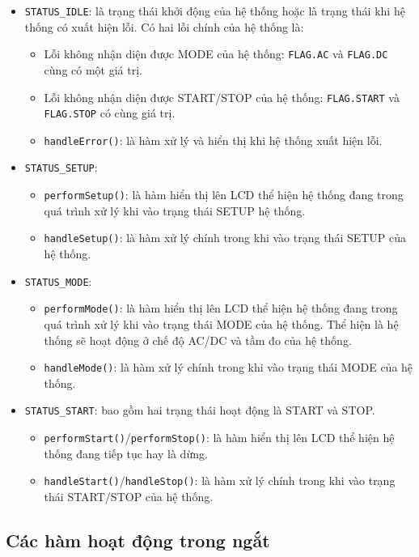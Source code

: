 \begin{itemize}[label = -]
	\item \texttt{STATUS\_IDLE}: là trạng thái khởi động của hệ thống hoặc là trạng thái khi hệ thống có xuất hiện lỗi. Có hai lỗi chính của hệ thống là:
		\begin{itemize}[label=+]
			\item Lỗi không nhận diện được MODE của hệ thống: \texttt{FLAG.AC} và \texttt{FLAG.DC} cùng có một giá trị.
			\item Lỗi không nhận diện được START/STOP của hệ thống: \texttt{FLAG.START} và \texttt{FLAG.STOP} có cùng giá trị.
			\item \texttt{handleError()}: là hàm xử lý và hiển thị khi hệ thống xuất hiện lỗi.
		\end{itemize}
	\item \texttt{STATUS\_SETUP}:
		\begin{itemize}[label = +]
			\item \texttt{performSetup()}: là hàm hiển thị lên LCD thể hiện hệ thống đang trong quá trình xử lý khi vào trạng thái SETUP hệ thống.
			\item \texttt{handleSetup()}: là hàm xử lý chính trong khi vào trạng thái SETUP của hệ thống.
		\end{itemize}
	\item \texttt{STATUS\_MODE}:
		\begin{itemize}[label = +]
			\item \texttt{performMode()}: là hàm hiển thị lên LCD thể hiện hệ thống đang trong quá trình xử lý khi vào trạng thái MODE của hệ thống. Thể hiện là hệ thống sẽ hoạt động ở chế độ AC/DC và tầm đo của hệ thống.
			\item \texttt{handleMode()}: là hàm xử lý chính trong khi vào trạng thái MODE của hệ thống.
		\end{itemize}
	\item \texttt{STATUS\_START}: bao gồm hai trạng thái hoạt động là START và STOP.
		\begin{itemize}[label = +]
			\item \texttt{performStart()}/\texttt{performStop()}: là hàm hiển thị lên LCD thể hiện hệ thống đang tiếp tục hay là dừng.
			\item \texttt{handleStart()}/\texttt{handleStop()}: là hàm xử lý chính trong khi vào trạng thái START/STOP của hệ thống.
		\end{itemize}
\end{itemize}

\subsection{Các hàm hoạt động trong ngắt}

